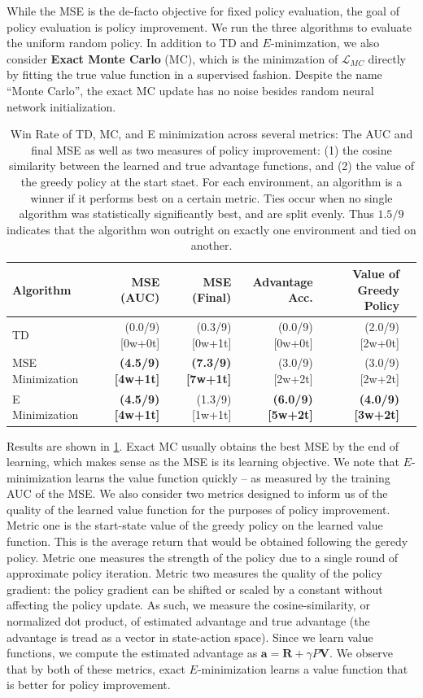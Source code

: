 \documentclass{article}
\theoremstyle{plain}
\theoremstyle{definition}
\theoremstyle{remark}
\begin{document}
While the MSE is the de-facto objective for fixed policy evaluation, the goal of policy evaluation is policy improvement. We run the three algorithms to evaluate the uniform random policy. In addition to TD and $E$-minimzation, we also consider \textbf{Exact Monte Carlo} (MC), which is the minimzation of $\mathcal{L}_{MC}$ directly by fitting the true value function in a supervised fashion. Despite the name ``Monte Carlo'', the exact MC update has no noise besides random neural network initialization.

\begin{table}[tbp]
  \centering
  \begin{tabular}{lrrrrr}
  \toprule
  \textbf{Algorithm} & \textbf{MSE (AUC)} & \textbf{MSE (Final)} & \textbf{Advantage Acc.} & \textbf{Value of Greedy Policy} \\
  \midrule
  TD & (0.0/9) [0w+0t] & (0.3/9) [0w+1t] & (0.0/9) [0w+0t] &  (2.0/9) [2w+0t]  \\
  MSE Minimization & \textbf{ (4.5/9) [4w+1t]} & \textbf{ (7.3/9) [7w+1t]} &  (3.0/9) [2w+2t] &  (3.0/9) [2w+2t] \\
  E Minimization & \textbf{ (4.5/9) [4w+1t]} &  (1.3/9) [1w+1t] & \textbf{ (6.0/9) [5w+2t]} & \textbf{ (4.0/9) [3w+2t]} \\
  \bottomrule
  \end{tabular}
  \caption{Win Rate of TD, MC, and E minimization across several metrics: The AUC and final MSE as well as two measures of policy improvement: (1) the cosine similarity between the learned and true advantage functions, and (2) the value of the greedy policy at the start staet. For each environment, an algorithm is a winner if it performs best on a certain metric. Ties occur when no single algorithm was statistically significantly best, and are split evenly. Thus $1.5/9$ indicates that the algorithm won outright on exactly one environment and tied on another.}   \label{tab:table4_env_win_rate_triad_k64}
  \end{table}
  
  Results are shown in \ref{tab:table4_env_win_rate_triad_k64}. Exact MC usually obtains the best MSE by the end of learning, which makes sense as the MSE is its learning objective. We note that $E$-minimization learns the value function quickly -- as measured by the training AUC of the MSE. We also consider two metrics designed to inform us of the quality of the learned value function for the purposes of policy improvement. Metric one is the start-state value of the greedy policy on the learned value function. This is the average return that would be obtained following the geredy policy. Metric one measures the strength of the policy due to a single round of approximate policy iteration. Metric two measures the quality of the policy gradient: the policy gradient can be shifted or scaled by a constant without affecting the policy update. As such, we measure the cosine-similarity, or normalized dot product, of estimated advantage and true advantage (the advantage is tread as a vector in state-action space). Since we learn value functions, we compute the estimated advantage as $\bm{a} =\bm{R} + \gamma P \bm{V}$. We observe that by both of these metrics, exact $E$-minimization learns a value function that is better for policy improvement.
\end{document}

